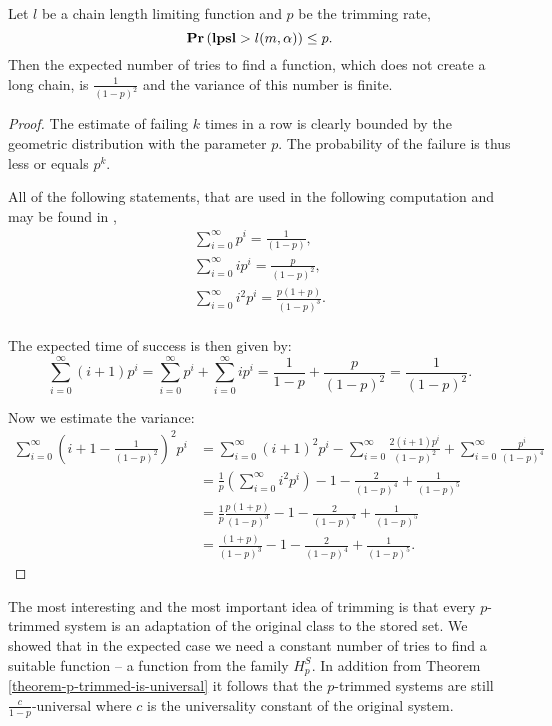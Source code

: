 \begin{lemma}
\label{lemma-linear-transformations-tries}
Let $l$ be a chain length limiting function and $p$ be the trimming rate, \[ \mathbf{Pr}\left(\mathbf{lpsl} > l(m, \alpha)\right) \leq p \text{.} \] Then the expected number of tries to find a function, which does not create a long chain, is $\frac{1}{(1 - p)^2}$ and the variance of this number is finite.
\end{lemma}
\begin{proof}
The estimate of failing $k$ times in a row is clearly bounded by the geometric distribution with  the parameter $p$. The probability of the failure is thus less or equals $p ^ k$. 

All of the following statements, that are used in the following computation and may be found in \cite{210884},
\begin{gather*}
	\displaystyle\sum_{i = 0}^{\infty} p ^ i = \frac{1}{(1 - p)} \text{,} \\
	\displaystyle\sum_{i = 0}^{\infty} i p ^ i = \frac{p}{(1 - p) ^ 2} \text{,} \\
	\displaystyle\sum_{i = 0}^{\infty} i^2 p ^ i = \frac{p(1 + p)}{(1 - p) ^ 3} \text{.} \\
\end{gather*}

The expected time of success is then given by:
\[
\sum_{i = 0}^{\infty} (i + 1)p^i = \sum_{i = 0}^{\infty}p^i + \sum_{i = 0}^{\infty}ip^i = \frac{1}{1 - p} + \frac{p}{(1- p)^2} = \frac{1}{(1 - p)^2} \text{.}
\]

Now we estimate the variance:
\[
\begin{split}
\sum_{i = 0}^{\infty} \left(i + 1 - \frac{1}{(1 - p) ^ 2}\right) ^ 2  p ^ i
	& = \sum_{i = 0}^{\infty} \left(i + 1\right) ^ 2 p ^ i - \sum_{i = 0}^{\infty} \frac{2(i + 1)p ^ i}{(1 - p) ^ 2} +   \sum_{i = 0}^{\infty} \frac{p ^ i}{(1 - p) ^ 4} \\
	& = \frac{1}{p}\left(\sum_{i = 0}^{\infty} i ^ 2 p ^ i \right) - 1 - \frac{2}{(1 - p) ^ 4} + \frac{1}{(1 - p) ^ 5} \\
	& = \frac{1}{p}\frac{p(1 + p)}{(1 - p) ^ 3} - 1 - \frac{2}{(1 - p) ^ 4} + \frac{1}{(1 - p) ^ 5} \\
	& = \frac{(1 + p)}{(1 - p) ^ 3} - 1 - \frac{2}{(1 - p) ^ 4} + \frac{1}{(1 - p) ^ 5} \text{.}
\end{split}
\]
\end{proof}

The most interesting and the most important idea of trimming is that every $p$-trimmed system is an adaptation of the original class to the stored set. We showed that in the expected case we need a constant number of tries to find a suitable function -- a function from the family $H_p^S$. In addition from Theorem \ref{theorem-p-trimmed-is-universal} it follows that the $p$-trimmed systems are still $\frac{c}{1 - p}$-universal where $c$ is the universality constant of the original system.

